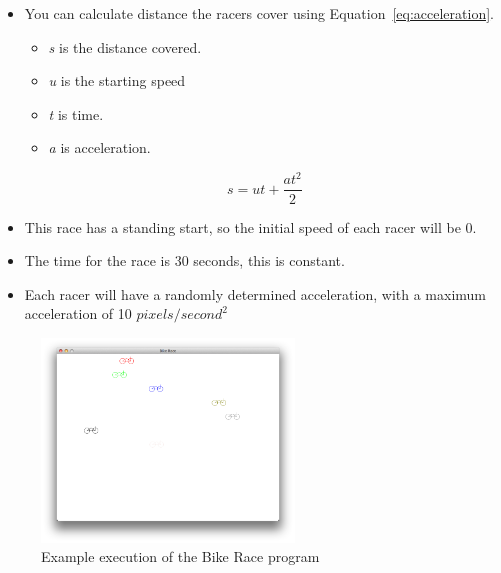 \begin{itemize}
  \item You can calculate distance the racers cover using Equation~\ref{eq:acceleration}.
  \begin{itemize}
    \item \emph{s} is the distance covered.
    \item \emph{u} is the starting speed
    \item \emph{t} is time.
    \item \emph{a} is acceleration.
  \end{itemize} 
  \begin{equation}
    s = ut + \frac{a t^2}{2}
    \label{eq:acceleration}
  \end{equation}
  \item This race has a standing start, so the initial speed of each racer will be 0.
  \item The time for the race is 30 seconds, this is constant.
  \item Each racer will have a randomly determined acceleration, with a maximum acceleration of 10 $pixels/second^2$
\end{itemize}

\begin{figure}[h]
   \centering
   \includegraphics[width=0.6\textwidth]{./topics/storing-using-data/examples/BikeRace.png} 
   \caption{Example execution of the Bike Race program}
   \label{fig:bike-race-img}
\end{figure}




